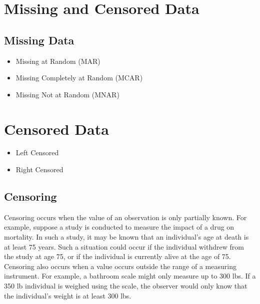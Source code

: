\section{Missing and Censored Data}
\subsection{Missing Data}


\begin{itemize}
\item Missing at Random (MAR)
\item Missing Completely at Random (MCAR)
\item Missing Not at Random (MNAR)
\end{itemize}

\section{Censored Data}

\begin{itemize}
\item Left Censored
\item Right Censored
\end{itemize}

\subsection{Censoring}
Censoring occurs when the value of an observation is only partially known. 
For example, suppose a study is conducted to measure the impact of a drug on mortality. 
In such a study, it may be known that an individual's age at death is at least 75 years. 
Such a situation could occur if the individual withdrew from the study at age 75, or if the individual is currently 
alive at the age of 75.
Censoring also occurs when a value occurs outside the range of a measuring instrument. 
For example, a bathroom scale might only measure up to 300 lbs. 
If a 350 lb individual is weighed using the scale, the observer would only know that the individual's weight is at 
least 300 lbs.





